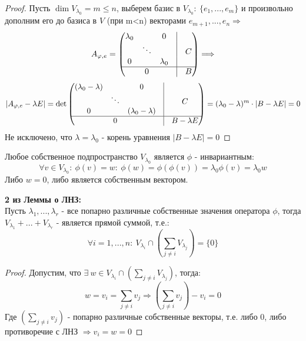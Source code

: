     \begin{proof}
        Пусть $\dim V_{\lambda_0} = m \leq n$, выберем базис в $V_{\lambda_0}: \ \{e_1,...,e_m\}$ и произвольно дополним его до базиса в $V$ (при m<n) векторами $e_{m+1},...,e_n \Longrightarrow$
        $$A_{\phi,e} = \begin{pmatrix}
            \lambda_0 & \null & 0 & \vline & \null \\
            \null & \ddots & \null & \vline & C \\
            0 & \null & \lambda_0 & \vline & \null \\
            \hline
            \null & 0 & \null & \vline & B
        \end{pmatrix} \Longrightarrow $$
        $$|A_{\phi,e} - \lambda E| = \det\begin{pmatrix}
            (\lambda_0 - \lambda) & \null & 0 & \vline & \null \\
            \null & \ddots & \null & \vline & C \\
            0 & \null & (\lambda_0 - \lambda) & \vline & \null \\
            \hline
            \null & 0 & \null & \vline & B - \lambda E
        \end{pmatrix} = (\lambda_0-\lambda)^m\cdot |B-\lambda E|=0$$
        Не исключено, что $\lambda = \lambda_0$ - корень уравнения $|B-\lambda E| =0 $       
    \end{proof} 
    \begin{remark}
        Любое собственное подпространство $V_{\lambda_0}$ является $\phi$ - инвариантным:
        $$\forall v \in V_{\lambda_0}: \ \phi(v) = w: \ \phi(w) = \phi(\phi(v)) = \lambda_0 \phi(v) = \lambda_0 w$$
        Либо $w=0$, либо является собственным вектором.   
    \end{remark}
    \begin{consequense} \textbf{2 из Леммы о ЛНЗ:} \\
        Пусть $\lambda_1,...,\lambda_r$ - все попарно различные собственные значения оператора $\phi$, тогда $V_{\lambda_1} + ... + V_{\lambda_r}$ - является прямой суммой, т.е.:
        $$\forall i = 1,...,n: \  V_{\lambda_i} \cap (\sum \limits_{j\neq i}V_{\lambda_j}) = \{0\}$$   
    \end{consequense}
    \begin{proof}
        Допустим, что $\exists \ w \in V_{\lambda_i} \cap (\sum \limits_{j\neq i}V_{\lambda_j})$, тогда: 
        $$w = v_i = \sum \limits_{j\neq i}v_j \Longrightarrow (\sum \limits_{j\neq i}v_j) - v_i = 0$$
        Где $(\sum \limits_{j\neq i}v_j)$ - попарно различные собственные векторы, т.е. либо $0$, либо противоречие с ЛНЗ $\Longrightarrow v_i = w = 0$    
    \end{proof}
